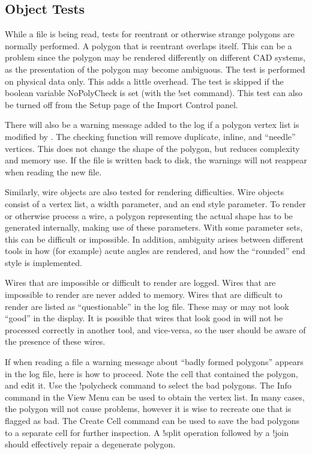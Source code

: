 \subsection{Object Tests}

While a file is being read, tests for reentrant or otherwise strange
polygons are normally performed.  A polygon that is reentrant overlaps
itself.  This can be a problem since the polygon may be rendered
differently on different CAD systems, as the presentation of the
polygon may become ambiguous.  The test is performed on physical data
only.  This adds a little overhead.  The test is skipped if the
boolean variable {\et NoPolyCheck} is set (with the {\cb !set}
command).  This test can also be turned off from the {\cb Setup} page
of the {\cb Import Control} panel.

There will also be a warning message added to the log if a polygon
vertex list is modified by {\Xic}.  The checking function will remove
duplicate, inline, and ``needle'' vertices.  This does not change the
shape of the polygon, but reduces complexity and memory use.  If the
file is written back to disk, the warnings will not reappear when
reading the new file.

Similarly, wire objects are also tested for rendering difficulties. 
Wire objects consist of a vertex list, a width parameter, and an end
style parameter.  To render or otherwise process a wire, a polygon
representing the actual shape has to be generated internally, making
use of these parameters.  With some parameter sets, this can be
difficult or impossible.  In addition, ambiguity arises between
different tools in how (for example) acute angles are rendered, and
how the ``rounded'' end style is implemented.

Wires that are impossible or difficult to render are logged.  Wires
that are impossible to render are never added to memory.  Wires that
are difficult to render are listed as ``questionable'' in the log
file.  These may or may not look ``good'' in the {\Xic} display.  It
is possible that wires that look good in {\Xic} will not be processed
correctly in another tool, and vice-versa, so the user should be
aware of the presence of these wires. 

If when reading a file a warning message about ``badly formed
polygons'' appears in the log file, here is how to proceed.  Note the
cell that contained the polygon, and edit it.  Use the {\cb
!polycheck} command to select the bad polygons.  The {\cb Info}
command in the {\cb View Menu} can be used to obtain the vertex list. 
In many cases, the polygon will not cause problems, however it is
wise to recreate one that is flagged as bad.  The {\cb Create Cell}
command can be used to save the bad polygons to a separate cell for
further inspection.  A {\cb !split} operation followed by a {\cb
!join} should effectively repair a degenerate polygon.

